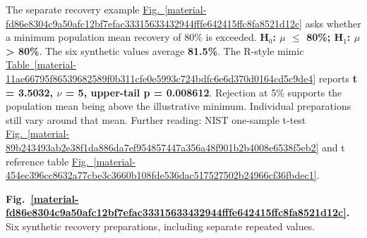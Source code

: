 \documentclass[11pt,a4paper]{article}
\begin{document}
The separate recovery example \hyperref[material-fd86e8304c9a50afc12bf7efac33315633432944fffe642415ffc8fa8521d12c]{Fig.~\ref*{material-fd86e8304c9a50afc12bf7efac33315633432944fffe642415ffc8fa8521d12c}} asks whether a minimum population mean recovery of 80\% is exceeded. \textbf{H\ensuremath{{}_0}: \ensuremath{\mu} \ensuremath{\le} 80\%; H\ensuremath{{}_1}: \ensuremath{\mu} > 80\%}. The six synthetic values average \textbf{81.5\%}. The R-style mimic \hyperref[material-11ae66795f86539682589f0b311cfe0e5993c724bdfc6e6d370d0164cd5c9de4]{Table~\ref*{material-11ae66795f86539682589f0b311cfe0e5993c724bdfc6e6d370d0164cd5c9de4}} reports \textbf{t = 3.5032, \ensuremath{\nu} = 5, upper-tail p = 0.008612}. Rejection at 5\% supports the population mean being above the illustrative minimum. Individual preparations still vary around that mean. Further reading: NIST one-sample t-test \hyperref[material-89b243493ab2e38f1da886da7ef954857447a356a48f901b2b4008e6538f5eb2]{Fig.~\ref*{material-89b243493ab2e38f1da886da7ef954857447a356a48f901b2b4008e6538f5eb2}} and t reference table \hyperref[material-454ec396cc8632a77cbe3c3660b108fde536dac517527502b24966cf36fbdec1]{Fig.~\ref*{material-454ec396cc8632a77cbe3c3660b108fde536dac517527502b24966cf36fbdec1}}.


\par\medskip
\Needspace{10cm}
\label{material-fd86e8304c9a50afc12bf7efac33315633432944fffe642415ffc8fa8521d12c}
\noindent\textbf{Fig.~\ref*{material-fd86e8304c9a50afc12bf7efac33315633432944fffe642415ffc8fa8521d12c}.} Six synthetic recovery preparations, including separate repeated values.\par\nopagebreak
\begin{center}
\end{center}
\end{document}
